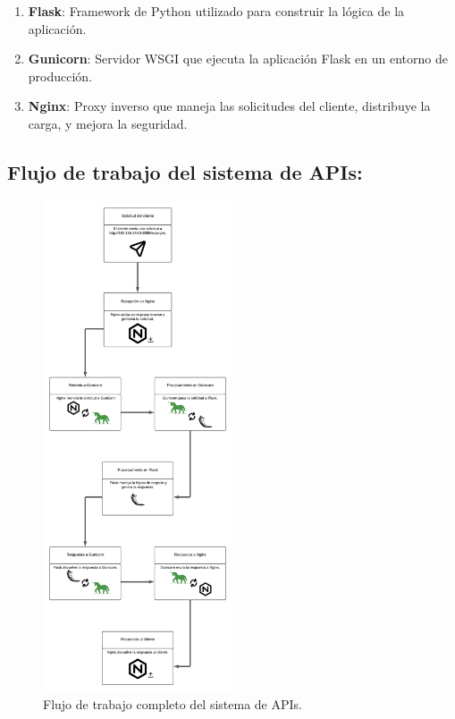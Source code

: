 \begin{enumerate}[label=\alph*)]
    \item \textbf{Flask}: Framework de Python utilizado para construir la lógica de la aplicación.
    \item \textbf{Gunicorn}: Servidor WSGI que ejecuta la aplicación Flask en un entorno de producción.
    \item \textbf{Nginx}: Proxy inverso que maneja las solicitudes del cliente, distribuye la carga, y mejora la seguridad.
\end{enumerate}

\subsection*{Flujo de trabajo del sistema de APIs:}

\begin{figure}[H]
    \centering
    \includegraphics[width=0.5\textwidth]{figuras/DiagramaImplementacionGU-NG.png}
    \caption{Flujo de trabajo completo del sistema de APIs.}
    \label{fig:DiagramaImplementacionGU-NG}
\end{figure}

